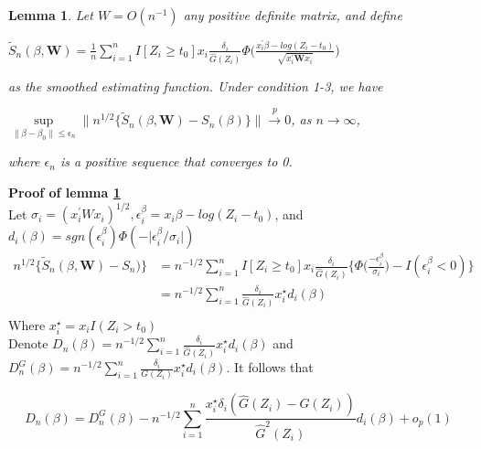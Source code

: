 \documentclass[12pt]{article}
\newtheorem{lemma}[theorem]{Lemma}
\begin{document}
	\begin{lemma} \label{lemma : 1}
		Let $ W=O(n^{-1})$ any positive definite matrix, and define
		\begin{center}
			$\tilde{S}_n(\beta, \textbf{W})=\frac{1}{n} \sum_{i=1}^{n} I[Z_i \geq t_0] x_i \frac{\delta_i}{\hat{G}(Z_i)}\Phi\Big(\frac{x_i^\prime\beta-log(Z_i-t_0)}{\sqrt{x_i^{\prime} \textbf{W}x_{i}}}\Big)$
		\end{center}
		as the smoothed estimating function. Under condition 1-3, we have
		\begin{center}
			$\sup\limits_{\lVert \beta - \beta_0 \rVert \leq \epsilon_n} \lVert {n^{1/2}} \{ \tilde{S}_n(\beta, \textbf{W})-S_n(\beta) \} \rVert \xrightarrow{p} 0$, as $n\to\infty$,		
		\end{center}
		where ${\epsilon_n}$ is a positive sequence that converges to 0.
	\end{lemma}
\newpage
	\noindent \textbf{Proof of lemma \ref {lemma : 1}}\\
	Let $\sigma_i=(x_i^\prime W x_i)^{1/2}, \epsilon_i^\beta=x_i\beta-log(Z_i-t_0)$, and $d_i(\beta)=sgn(\epsilon_i^\beta)\Phi(-\lvert\epsilon_i^\beta/\sigma_i\rvert)$\\
	\begin{align*}
		n^{1/2}\{ \tilde{S}_n(\beta, \textbf{W})-S_n)\} & = n^{-1/2} \sum_{i=1}^{n}I[Z_i \geq t_0] x_i \frac{\delta_i}{\hat{G}(Z_i)}\bigg\{ \Phi \bigg(\frac{-\epsilon_i^\beta}{\sigma_i}\bigg)-I(\epsilon_i^\beta<0) \bigg\}\\
		& = n^{-1/2} \sum_{i=1}^{n} \frac{\delta_i}{\hat{G}(Z_i)} x_i^\star d_i(\beta)\\
	\end{align*}
	Where $x_i^\star = x_i I(Z_i>t_0)$\\

	\noindent Denote $D_n(\beta)=n^{-1/2} \sum_{i=1}^{n}\frac{\delta_i}{\hat{G}(Z_i)} x_i^\star d_i(\beta)$ and $D_n^G(\beta)=n^{-1/2} \sum_{i=1}^{n} \frac{\delta_i}{G(Z_i)} x_i^\star d_i(\beta)$. It follows that

	\begin{equation} \label{eq:8}
		D_n(\beta)=D_n^G(\beta)-n^{-1/2} \sum_{i=1}^{n}\frac{x_i^\star\delta_i(\hat{G}(Z_i)-G(Z_i))}{\hat{G}^2(Z_i)}d_i(\beta)+o_p(1)
	\end{equation}
\end{document}
